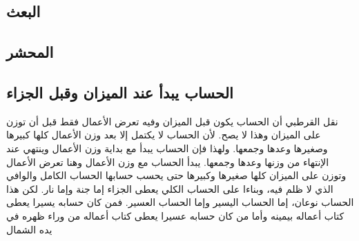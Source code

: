 \subsection{البعث}

\subsection{المحشر}





\subsection{الحساب يبدأ عند الميزان وقبل الجزاء}


نقل القرطبي أن الحساب يكون قبل الميزان وفيه تعرض الأعمال فقط قبل أن توزن على الميزان وهذا لا يصح. لأن الحساب لا يكتمل إلا بعد وزن الأعمال كلها كبيرها وصغيرها وعدها وجمعها. ولهذا فإن الحساب يبدأ مع بداية وزن الأعمال وينتهي عند الإنتهاء من وزنها وعدها وجمعها. يبدأ الحساب مع وزن الأعمال وهنا تعرض الأعمال وتوزن على الميزان كلها صغيرها وكبيرها حتى يحسب حسابها الحساب الكامل والوافي الذي لا ظلم فيه، وبناءا على الحساب الكلي يعطى الجزاء إما جنة وإما نار. لكن هذا الحساب نوعان، إما الحساب اليسير وإما الحساب العسير. فمن كان حسابه يسيرا يعطى كتاب أعماله بيمينه وأما من كان حسابه عسيرا يعطى كتاب أعماله من وراء ظهره في يده الشمال 

